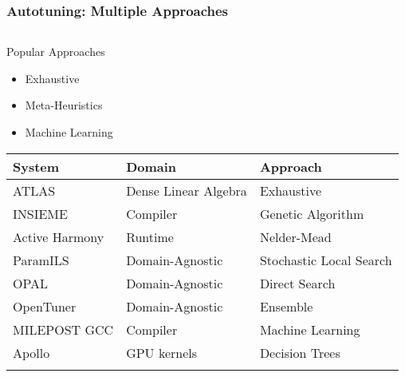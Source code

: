 \documentclass[10pt, compress, aspectratio=169, xcolor={table,usenames,dvipsnames}]{beamer}
\begin{document}
\begin{frame}
    \frametitle{Autotuning: Multiple Approaches}
    \begin{columns}[c]
            \begin{block}{Popular Approaches}
                \begin{itemize}
                    \item \footnotesize{\colorbox{red!25}{Exhaustive}}
                    \item \footnotesize{\colorbox{green!25}{Meta-Heuristics}}
                    \item \footnotesize{\colorbox{cyan!25}{Machine Learning}}
                \end{itemize}

                \vspace{-.4cm}

                \begin{table}
                    \centering
                    \scriptsize
                    \begin{tabular}{@{}lll@{}}
                        \toprule
                        System & Domain & Approach \\ \midrule
                        \rowcolor{red!25} ATLAS & Dense Linear Algebra & Exhaustive\\ \addlinespace
                        \rowcolor{green!25} INSIEME & Compiler & Genetic Algorithm \\
                        \rowcolor{green!25} Active Harmony & Runtime & Nelder-Mead \\
                        \rowcolor{green!25} ParamILS & Domain-Agnostic & Stochastic Local Search \\
                        \rowcolor{green!25} OPAL & Domain-Agnostic & Direct Search \\
                        \rowcolor{green!25} OpenTuner & Domain-Agnostic & Ensemble \\ \addlinespace
                        \rowcolor{cyan!25} MILEPOST GCC & Compiler & Machine Learning \\
                        \rowcolor{cyan!25} Apollo & GPU kernels & Decision Trees \\ \addlinespace
                        \bottomrule
                    \end{tabular}
                \end{table}
            \end{block}


\end{columns}
\end{frame}
\end{document}
